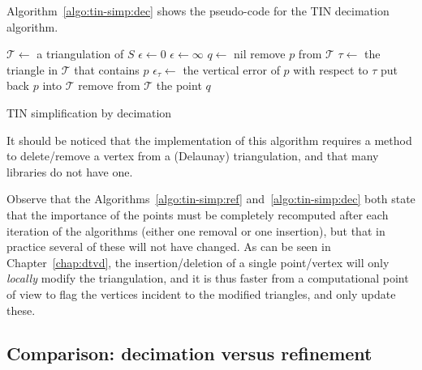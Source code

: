 Algorithm~\ref{algo:tin-simp:dec} shows the pseudo-code for the TIN decimation algorithm.
\begin{algorithm}[tb] 
	$\mathcal{T} \leftarrow$ a triangulation of $S$ \;
	$\epsilon \leftarrow 0$ \;
	\While{$\epsilon < \epsilon_{\max}$}
	{
		$\epsilon \leftarrow \infty$  \;
		$q \leftarrow$ nil \;
		{
			remove $p$ from $\mathcal{T}$ \;
			$\tau \leftarrow$ the triangle in $\mathcal{T}$ that contains $p$ \;
			$\epsilon_{\tau} \leftarrow$ the vertical error of $p$ with respect to $\tau$ \;
			put back $p$ into $\mathcal{T}$ \;
		}
		remove from $\mathcal{T}$ the point $q$ \;
	}
	\caption{TIN simplification by decimation}%
\label{algo:tin-simp:dec}
\end{algorithm}
It should be noticed that the implementation of this algorithm requires a method to delete/remove a vertex from a (Delaunay) triangulation, and that many libraries do not have one.

Observe that the Algorithms~\ref{algo:tin-simp:ref} and~\ref{algo:tin-simp:dec} both state that the importance of the points must be completely recomputed after each iteration of the algorithms (either one removal or one insertion), but that in practice several of these will not have changed.
As can be seen in Chapter~\ref{chap:dtvd}, the insertion/deletion of a single point/vertex will only \emph{locally} modify the triangulation, and it is thus faster from a computational point of view to flag the vertices incident to the modified triangles, and only update these.


%
\subsection{Comparison: decimation versus refinement}

